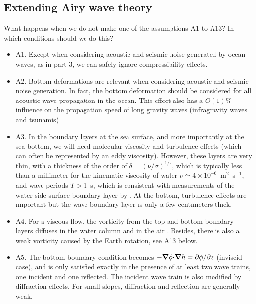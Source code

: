 \subsection{Extending Airy wave theory}
What happens when we do not make one of the assumptions A1 to A13? In which conditions should we do this? 
\begin{itemize}
  \item A1. Except when considering acoustic and seismic noise generated by ocean waves, as in part 3, we can 
safely ignore compressibility effects. \vspace{0.3cm}
  \item A2. Bottom deformations are relevant when considering acoustic and seismic noise generation. In fact, the bottom 
deformation should be considered for all acoustic wave propagation in the ocean. This effect also has a $O(1)$\% influence on the propagation speed of long gravity waves (infragravity waves and tsunamis) \citep{Abdolali&al.2019}  \vspace{0.3cm}
  \item A3. In the boundary layers at the sea surface, and more importantly at the sea bottom, 
we will need molecular viscosity and turbulence effects (which can often be represented by an eddy viscosity). 
However, these layers are very thin, with a thickness of the order of 
  $\delta=(\nu/\sigma)^{1/2}$, which is typically less than a millimeter for the kinematic viscosity of water 
$\nu \simeq 4\times 10^{-6}$~m$^2$~s$^{-1}$, and wave periods 
   $T > 1$~s, which is consistent with measurements of the water-side surface boundary layer by \cite{Banner&Peirson1998}. At the bottom, 
turbulence effects are important but the wave boundary layer is only a few centimeters thick.\vspace{0.3cm}
  \item A4. For a viscous flow, the vorticity from the top and bottom boundary layers diffuses in the water column 
and in the air \citep{Longuet-Higgins1953,Weber&Forland1990}. Besides, there is also a weak vorticity caused by the 
Earth rotation, see A13 below. \vspace{0.3cm}
  \item A5. The bottom boundary condition becomes $-\mbox{\boldmath $\nabla$} \phi \mbox{\boldmath $\cdot$} \mbox{\boldmath $\nabla$} h = \partial \phi/\partial z$ (inviscid case), 
and is only satisfied exactly in the presence of at least two wave trains, one incident and one reflected. The incident wave train 
is also modified by diffraction effects.
  For small slopes, diffraction and reflection are generally weak, 

\end{itemize}
